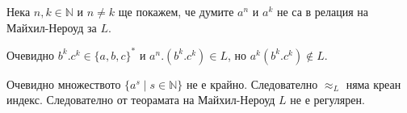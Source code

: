 \documentclass[12pt]{article}
\begin{document}
\par Нека \(n, k \in \mathbb{N}\) и \(n \neq k\) ще покажем, че думите \(a^n\) и \(a^k\) не са в релация на Майхил-Нероуд за \(L\).

\vspace*{5mm}

\par Очевидно \(b^k.c^k \in \{a, b, c\}^*\) и \(a^n.(b^k.c^k)\in L\), но \(a^k(b^k.c^k) \notin L\).

\vspace*{5mm}

\par Очевидно множеството \(\{a^s \mid s \in \mathbb{N}\}\) не е крайно.
Следователно \(\approx_L\) няма креан индекс. Следователно от теорамата на Майхил-Нероуд \(L\) не е регулярен.
\end{document}
